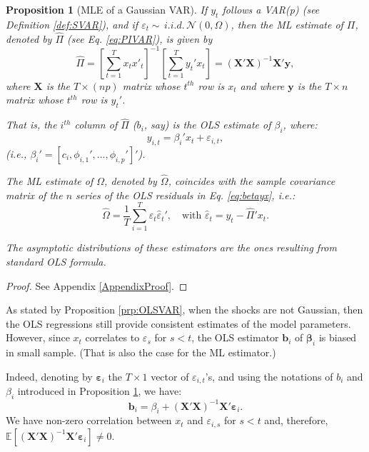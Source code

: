 \documentclass[
  12pt,
]{book}
\newtheorem{proposition}{Proposition}[chapter]
\theoremstyle{definition}
\theoremstyle{definition}
\theoremstyle{definition}
\theoremstyle{definition}
\theoremstyle{remark}
\begin{document}
\begin{proposition}[MLE of a Gaussian VAR]
\protect\hypertarget{prp:estimVARGaussian}{}\label{prp:estimVARGaussian}If \(y_t\) follows a VAR(p) (see Definition \ref{def:SVAR}), and if \(\varepsilon_t \sim \,i.i.d.\,\mathcal{N}(0,\Omega)\), then the ML estimate of \(\Pi\), denoted by \(\hat{\Pi}\) (see Eq. \eqref{eq:PIVAR}), is given by
\begin{equation}
\hat{\Pi}=\left[\sum_{t=1}^{T}x_{t}x'_{t}\right]^{-1}\left[\sum_{t=1}^{T}y_{t}'x_{t}\right]= (\mathbf{X}'\mathbf{X})^{-1}\mathbf{X}'\mathbf{y},\label{eq:Pi}
\end{equation}
where \(\mathbf{X}\) is the \(T \times (np)\) matrix whose \(t^{th}\) row is \(x_t\) and where \(\mathbf{y}\) is the \(T \times n\) matrix whose \(t^{th}\) row is \(y_{t}'\).

That is, the \(i^{th}\) column of \(\hat{\Pi}\) (\(b_i\), say) is the OLS estimate of \(\beta_i\), where:
\begin{equation}
y_{i,t} = \beta_i'x_t + \varepsilon_{i,t},\label{eq:betayx}
\end{equation}
(i.e., \(\beta_i' = [c_i,\phi_{i,1}',\dots,\phi_{i,p}']'\)).

The ML estimate of \(\Omega\), denoted by \(\hat{\Omega}\), coincides with the sample covariance matrix of the \(n\) series of the OLS residuals in Eq. \eqref{eq:betayx}, i.e.:
\begin{equation}
\hat{\Omega} = \frac{1}{T} \sum_{i=1}^T \hat{\varepsilon}_t\hat{\varepsilon}_t',\quad\mbox{with } \hat{\varepsilon}_t= y_t - \hat{\Pi}'x_t.
\end{equation}

The asymptotic distributions of these estimators are the ones resulting from standard OLS formula.
\end{proposition}

\begin{proof}
See Appendix \ref{AppendixProof}.
\end{proof}

As stated by Proposition \ref{prp:OLSVAR}, when the shocks are not Gaussian, then the OLS regressions still provide consistent estimates of the model parameters. However, since \(x_t\) correlates to \(\varepsilon_s\) for \(s<t\), the OLS estimator \(\mathbf{b}_i\) of \(\boldsymbol\beta_i\) is biased in small sample. (That is also the case for the ML estimator.)

Indeed, denoting by \(\boldsymbol\varepsilon_i\) the \(T \times 1\) vector of \(\varepsilon_{i,t}\)'s, and using the notations of \(b_i\) and \(\beta_i\) introduced in Proposition \ref{prp:estimVARGaussian}, we have:
\begin{equation}
\mathbf{b}_i = \beta_i + (\mathbf{X}'\mathbf{X})^{-1}\mathbf{X}'\boldsymbol\varepsilon_i.\label{eq:olsar1}
\end{equation}
We have non-zero correlation between \(x_t\) and \(\varepsilon_{i,s}\) for \(s<t\) and, therefore, \(\mathbb{E}[(\mathbf{X}'\mathbf{X})^{-1}\mathbf{X}'\boldsymbol\varepsilon_i] \ne 0\).
\end{document}
